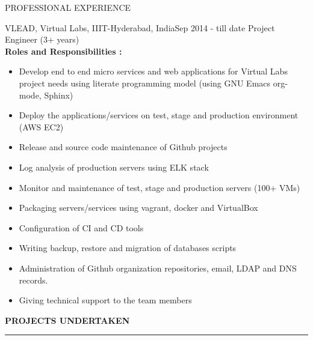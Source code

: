 \documentclass{resume} %
\begin{document}
\begin{rSection}{PROFESSIONAL EXPERIENCE}

   \begin{rSubsection}
    {VLEAD, Virtual Labs, IIIT-Hyderabad, India}{Sep 2014 - till date}
    {Project Engineer} {(3+ years)} \hfill 
    \\    
    \textbf{Roles and Responsibilities :}
    \begin{itemize}
      
    \item Develop end to end micro services and web applications for
      Virtual Labs project needs using literate programming model
      (using GNU Emacs org-mode, Sphinx)

    \item Deploy the applications/services on test, stage and
      production environment (AWS EC2)

    \item Release and source code maintenance of Github projects

    \item Log analysis of production servers using ELK stack      
      
    \item Monitor and maintenance of test, stage and production
      servers (100+ VMs)
      
    \item Packaging servers/services using vagrant,
      docker and VirtualBox

    \item Configuration of CI and CD tools
      
    \item Writing backup, restore and migration of databases scripts

    \item Administration of Github organization repositories,
      email, LDAP and DNS records.

    \item Giving technical support to the team members
    \end{itemize}

    \hfill



\textbf{PROJECTS UNDERTAKEN }
\sectionlineskip \hrule


\end{rSubsection}
\end{rSection}
\end{document}
